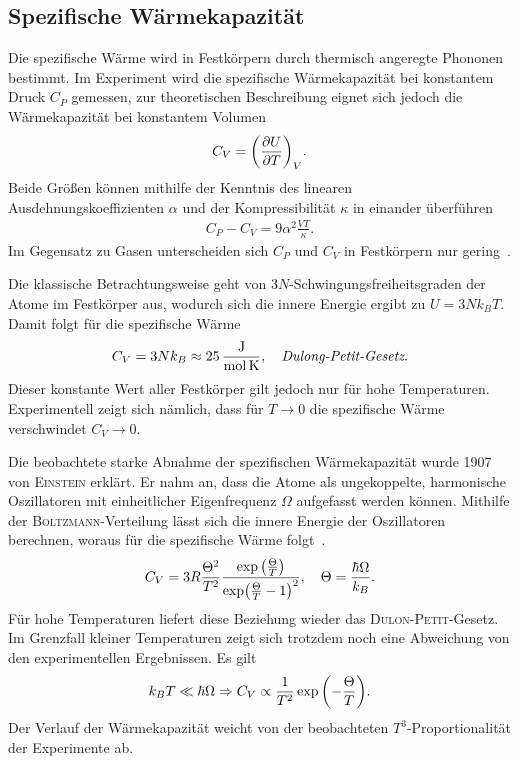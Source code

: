 \documentclass[parskip=half, a4paper,twoside,final]{article}
\begin{document}

\FloatBarrier

\subsection{Spezifische Wärmekapazität}
Die spezifische Wärme wird in Festkörpern durch thermisch angeregte Phononen bestimmt. Im Experiment wird die spezifische Wärmekapazität bei konstantem Druck $C_P$ gemessen, zur theoretischen Beschreibung eignet sich jedoch die Wärmekapazität bei konstantem Volumen
\begin{align}
  C_V = \qty(\pdv{U}{T})_V.
\end{align}
Beide Größen können mithilfe der Kenntnis des linearen Ausdehnungskoeffizienten $\alpha$ und der Kompressibilität $\kappa$ in einander überführen
\begin{align}
  C_P - C_V = 9 \alpha^2 \frac{V T}{\kappa}.
\end{align}
Im Gegensatz zu Gasen unterscheiden sich $C_P$ und $C_V$ in Festkörpern nur gering~\cite{Hunklinger}.

Die klassische Betrachtungsweise geht von $3N$-Schwingungsfreiheitsgraden der Atome im Festkörper aus, wodurch sich die innere Energie ergibt zu $U = 3 N k_B T$. Damit folgt für die spezifische Wärme
\begin{align}
  C_V = 3 N k_B \approx  \SI{25}{\joule\per\mole\per\kelvin}, \quad \emph{Dulong-Petit-Gesetz}.
\end{align}
Dieser konstante Wert aller Festkörper gilt jedoch nur für hohe Temperaturen. Experimentell zeigt sich nämlich, dass für $T \to 0$ die spezifische Wärme verschwindet $C_V \to 0$.

Die beobachtete starke Abnahme der spezifischen Wärmekapazität wurde 1907 von \textsc{Einstein} erklärt. Er nahm an, dass die Atome als ungekoppelte, harmonische Oszillatoren mit einheitlicher Eigenfrequenz $\Omega$ aufgefasst werden können. Mithilfe der \textsc{Boltzmann}-Verteilung lässt sich die innere Energie der Oszillatoren berechnen, woraus für die spezifische Wärme folgt~\cite{Demtroeder3}.
\begin{align}
  C_V = 3R\frac{\Theta^2}{T^2} \frac{\exp\qty(\frac{\Theta}{T})}{\exp(\frac{\Theta}{T}-1)^2}, \quad \Theta = \frac{\hbar \Omega}{k_B}.
\end{align}
Für hohe Temperaturen liefert diese Beziehung wieder das \textsc{Dulon-Petit}-Gesetz. Im Grenzfall kleiner Temperaturen zeigt sich trotzdem noch eine Abweichung von den experimentellen Ergebnissen. Es gilt
\begin{align}
  k_B T \ll \hbar \Omega  \Rightarrow C_V \propto \frac{1}{T^2} \exp\qty(-\frac{\Theta}{T}).
\end{align}
Der Verlauf der Wärmekapazität weicht von der beobachteten $T^3$-Proportionalität der Experimente ab.
\end{document}
